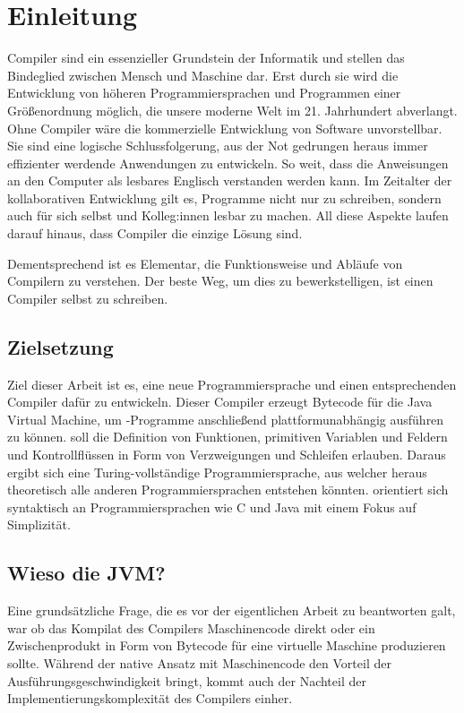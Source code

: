 \chapter{Einleitung}
\label{cha:Einleitung}

Compiler sind ein essenzieller Grundstein der Informatik und stellen das Bindeglied zwischen Mensch und Maschine dar. Erst durch sie wird die Entwicklung von höheren Programmiersprachen und Programmen einer Größenordnung möglich, die unsere moderne Welt im 21. Jahrhundert abverlangt. Ohne Compiler wäre die kommerzielle Entwicklung von Software unvorstellbar. Sie sind eine logische Schlussfolgerung, aus der Not gedrungen heraus immer effizienter werdende Anwendungen zu entwickeln. So weit, dass die Anweisungen an den Computer als lesbares Englisch verstanden werden kann. Im Zeitalter der kollaborativen Entwicklung gilt es, Programme nicht nur zu schreiben, sondern auch für sich selbst und Kolleg:innen lesbar zu machen. All diese Aspekte laufen darauf hinaus, dass Compiler die einzige Lösung sind.

Dementsprechend ist es Elementar, die Funktionsweise und Abläufe von Compilern zu verstehen. Der beste Weg, um dies zu bewerkstelligen, ist einen Compiler selbst zu schreiben.

\section{Zielsetzung}

Ziel dieser Arbeit ist es, eine neue Programmiersprache und einen entsprechenden Compiler dafür zu entwickeln. Dieser Compiler erzeugt Bytecode für die Java Virtual Machine, um \toya-Programme anschließend plattformunabhängig ausführen zu können. \Toya soll die Definition von Funktionen, primitiven Variablen und Feldern und Kontrollflüssen in Form von Verzweigungen und Schleifen erlauben. Daraus ergibt sich eine Turing-vollständige Programmiersprache, aus welcher heraus theoretisch alle anderen Programmiersprachen entstehen könnten. \Toya orientiert sich syntaktisch an Programmiersprachen wie C und Java mit einem Fokus auf Simplizität.

\section{Wieso die JVM?}

Eine grundsätzliche Frage, die es vor der eigentlichen Arbeit zu beantworten galt, war ob das Kompilat des \toya Compilers Maschinencode direkt oder ein Zwischenprodukt in Form von Bytecode für eine virtuelle Maschine produzieren sollte. Während der native Ansatz mit Maschinencode den Vorteil der Ausführungsgeschwindigkeit bringt, kommt auch der Nachteil der Implementierungskomplexität des Compilers einher.

